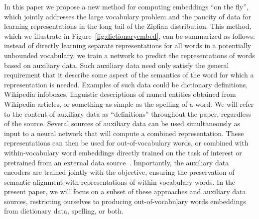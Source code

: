
In this paper we propose a new method for computing embeddings ``on the fly'', which jointly addresses the large vocabulary problem and the paucity of data for learning representations in the long tail of the Zipfian distribution. This method, which we illustrate in Figure~\ref{fig:dictionaryembed}, can be summarized as follows: instead of directly learning separate representations for all words in a potentially unbounded vocabulary, we train a network to predict the representations of words based on auxiliary data. Such auxiliary data need only satisfy the general requirement that it describe some aspect of the semantics of the word for which a representation is needed. Examples of such data could be dictionary definitions, Wikipedia infoboxes, linguistic descriptions of named entities obtained from Wikipedia articles, or something as simple as the spelling of a word. We will refer to the content of auxiliary data as ``definitions'' throughout the paper, regardless of the source. Several sources of auxiliary data can be used simultaneously as input to a neural network that will compute a combined  representation. These representations can then be used for out-of-vocabulary words, or combined with within-vocabulary word embeddings directly trained on the task of interest or pretrained from an external data source~\citep{mikolov2013distributed,pennington2014glove}. Importantly, the auxiliary data encoders are trained jointly with the objective, ensuring the preservation of semantic alignment with representations of within-vocabulary words. In the present paper, we will focus on a subset of these approaches and auxiliary data sources, restricting ourselves to producing out-of-vocabulary words embeddings from dictionary data, spelling, or both. 


